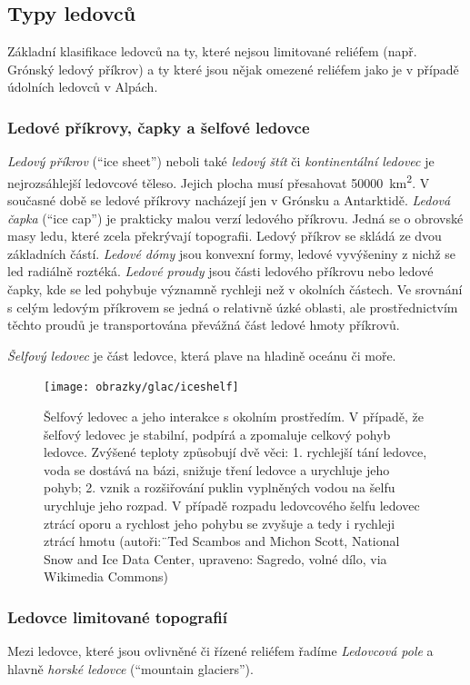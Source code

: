 \subsection{Typy ledovců}
Základní klasifikace ledovců na ty, které nejsou limitované reliéfem (např. Grónský ledový příkrov) a ty které jsou nějak omezené reliéfem jako je v případě údolních ledovců v Alpách.

\subsubsection{Ledové příkrovy, čapky a šelfové ledovce}
\emph{Ledový příkrov} (\enquote{ice sheet}) neboli také \emph{ledový štít} či \emph{kontinentální ledovec} je nejrozsáhlejší ledovcové těleso. Jejich plocha musí přesahovat \SI{50000}{\square\kilo\metre}. V současné době se ledové příkrovy nacházejí jen v Grónsku a Antarktidě. \emph{Ledová čapka} (\enquote{ice cap}) je prakticky malou verzí ledového příkrovu. 
Jedná se o obrovské masy ledu, které zcela překrývají topografii. Ledový příkrov se skládá ze dvou základních částí. \emph{Ledové dómy} jsou konvexní formy, ledové vyvýšeniny z nichž se led radiálně roztéká. 
\emph{Ledové proudy} jsou části ledového příkrovu nebo ledové čapky, kde se led pohybuje významně rychleji než v okolních částech. Ve srovnání s celým ledovým příkrovem se jedná o relativně úzké oblasti, ale prostřednictvím těchto proudů je transportována převážná část ledové hmoty příkrovů. 

\emph{Šelfový ledovec} je část ledovce, která plave na hladině oceánu či moře. 
\begin{figure}[h]
	\centering
	\texttt{[image: obrazky/glac/iceshelf]}
	\caption{Šelfový ledovec a jeho interakce s okolním prostředím. V případě, že šelfový ledovec je stabilní, podpírá a zpomaluje celkový pohyb ledovce. Zvýšené teploty způsobují dvě věci: 1. rychlejší tání ledovce, voda se dostává na bázi, snižuje tření ledovce a urychluje jeho pohyb; 2. vznik a rozšiřování puklin vyplněných vodou na šelfu urychluje jeho rozpad. V případě rozpadu ledovcového šelfu ledovec ztrácí oporu a rychlost jeho pohybu se zvyšuje a tedy i rychleji ztrácí hmotu (autoři:¨Ted Scambos and Michon Scott, National Snow and Ice Data Center, upraveno: Sagredo, volné dílo, via Wikimedia Commons)}
	\label{fig:iceshelf}
\end{figure}

\subsubsection{Ledovce limitované topografií}
Mezi ledovce, které jsou ovlivněné či řízené reliéfem řadíme \emph{Ledovcová pole} a hlavně \emph{horské ledovce} (\enquote{mountain glaciers}).

